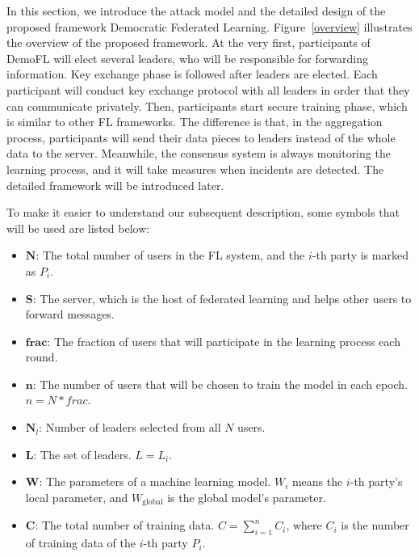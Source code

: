 In this section, we introduce the attack model and the detailed design of the proposed framework Democratic Federated Learning. Figure~\ref{overview} illustrates the overview of the proposed framework. At the very first, participants of DemoFL will elect several leaders, who will be responsible for forwarding information. Key exchange phase is followed after leaders are elected. Each participant will conduct key exchange protocol with all leaders in order that they can communicate privately. Then, participants start secure training phase, which is similar to other FL frameworks. The difference is that, in the aggregation process, participants will send their data pieces to leaders instead of the whole data to the server. Meanwhile, the consensus system is always monitoring the learning process, and it will take measures when incidents are detected. The detailed framework will be introduced later.

To make it easier to understand our subsequent description, some symbols that will be used are listed below:

\begin{itemize}
    \item $\textbf{N}$: The total number of users in the FL system, and the $i$-th party is marked as $P_i$.
    \item $\textbf{S}$: The server, which is the host of federated learning and helps other users to forward messages.
    \item $\textbf{frac}$: The fraction of users that will participate in the learning process each round.
    \item $\textbf{n}$: The number of users that will be chosen to train the model in each epoch. $n = N * frac$.
    \item $\textbf{N}_l$: Number of leaders selected from all $N$ users.
    \item $\textbf{L}$: The set of leaders. $L = {L_i}$.
    \item $\textbf{W}$: The parameters of a machine learning model. $W_i$ means the $i$-th party's local parameter, and $W_\textrm{global}$ is the global model's parameter.
    \item $\textbf{C}$: The total number of training data. $C = \sum_{i=1}^nC_i$, where $C_i$ is the number of training data of the $i$-th party $P_i$.
\end{itemize}

